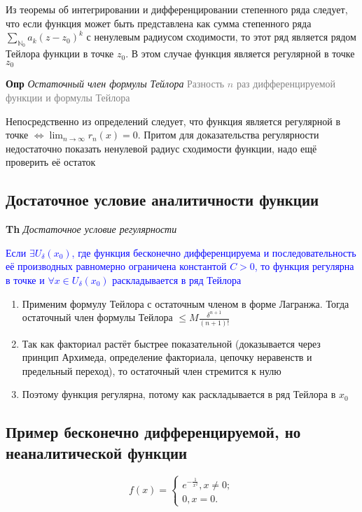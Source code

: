 Из теоремы об интегрировании и дифференцировании степенного ряда следует, что если функция может быть
представлена как сумма степенного ряда $\sum_{\mathbb{N}_0} a_k (z - z_0)^k$ с ненулевым радиусом сходимости, то
этот ряд является рядом Тейлора функции в точке $z_0$.
В этом случае функция является регулярной в точке $z_0$

\textbf{Опр} \textit{Остаточный член формулы Тейлора} \textcolor{gray}{Разность $n$ раз дифференцируемой функции
и формулы Тейлора}

Непосредственно из определений следует, что функция является регулярной в точке
$\Leftrightarrow \lim_{n\to\infty} r_n(x) = 0$.
Притом для доказательства регулярности недостаточно показать ненулевой радиус сходимости функции, надо ещё проверить
её остаток

\subsection{Достаточное условие аналитичности функции}

\textbf{Th} \textit{Достаточное условие регулярности}

\textcolor{blue}{Если $\exists U_\delta (x_0)$, где функция бесконечно дифференцируема и последовательность её
производных равномерно ограничена константой $C > 0$, то функция регулярна в точке и $\forall x \in U_\delta (x_0)$
    раскладывается в ряд Тейлора}

\begin{enumerate}
    \item Применим формулу Тейлора с остаточным членом в форме Лагранжа.
    Тогда остаточный член формулы Тейлора $\leq M \frac{\delta^{n+1}}{(n+1)!}$
    \item Так как факториал растёт быстрее показательной (доказывается через принцип Архимеда, определение
    факториала, цепочку неравенств и предельный переход), то остаточный член стремится к нулю
    \item Поэтому функция регулярна, потому как раскладывается в ряд Тейлора в $x_0$
\end{enumerate}

\subsection{Пример бесконечно дифференцируемой, но неаналитической функции}

\begin{equation}
    f(x) =
    \begin{cases}
        e^{-\frac{1}{x^2}}, x \neq 0; \\
        0, x = 0.
    \end{cases}
\end{equation}

